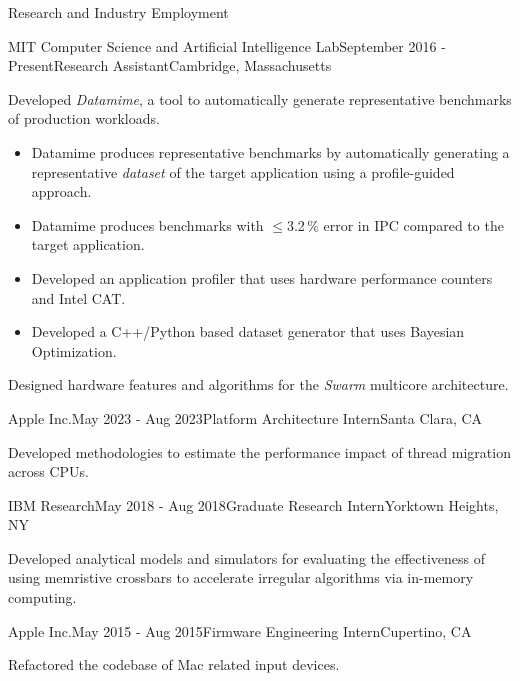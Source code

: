 \documentclass{resume} %
\begin{document}
\begin{rSection}{Research and Industry Employment}
\begin{rSubsection}{MIT Computer Science and Artificial Intelligence Lab}{September 2016 - Present}{Research Assistant}{Cambridge, Massachusetts}
    \vspace{0.2cm}
\item Developed {\it Datamime}, a tool to automatically generate representative benchmarks of production workloads.
    \vspace{-0.2cm}
    \begin{itemize}
        \item Datamime produces representative benchmarks by automatically generating a representative \emph{dataset}
            of the target application using a profile-guided approach.
        \item Datamime produces benchmarks with $\leq$3.2\,\% error in IPC compared to the target application.
        \item Developed an application profiler that uses hardware performance counters and Intel CAT.
        \item Developed a C++/Python based dataset generator that uses Bayesian Optimization.
    \end{itemize}
    \vspace{0.2cm}
\item Designed hardware features and algorithms for the {\it Swarm} multicore architecture.
\end{rSubsection}

\begin{rSubsection}{Apple Inc.}{May 2023 - Aug 2023}{Platform Architecture Intern}{Santa Clara, CA}

\item Developed methodologies to estimate the performance impact of thread migration across CPUs.
\end{rSubsection}

\begin{rSubsection}{IBM Research}{May 2018 - Aug 2018}{Graduate Research Intern}{Yorktown Heights, NY}

\item Developed analytical models and simulators for evaluating the effectiveness of using memristive crossbars
to accelerate irregular algorithms via in-memory computing.
\end{rSubsection}

\begin{rSubsection}{Apple Inc.}{May 2015 - Aug 2015}{Firmware Engineering Intern}{Cupertino, CA}

\item Refactored the codebase of Mac related input devices. 
\end{rSubsection}


\end{rSection}
\end{document}
